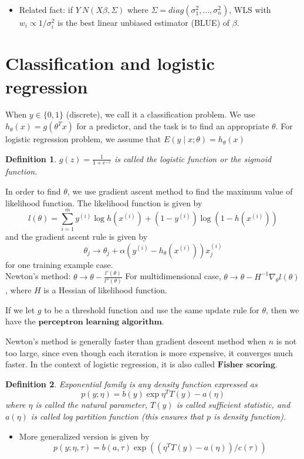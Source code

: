 \documentclass{article}
\newtheorem{definition}{Definition}
\theoremstyle{remark}
\begin{document}
\begin{itemize}
    \item Related fact: if $Y~N(X\beta, \Sigma)$ where $\Sigma=diag(\sigma_1^2,\dots,\sigma^2_n)$, WLS with $w_i\propto 1/\sigma^2_i$ is the best linear unbiased estimator (BLUE) of $\beta$.
\end{itemize}

\section*{Classification and logistic regression}
When $y\in\{0,1\}$ (discrete), we call it a classification problem. We use $h_\theta (x)=g(\theta^T x)$ for a predictor, and the task is to find an appropriate $\theta$. For logistic regression problem, we assume that $E(y\mid x;\theta)=h_\theta (x)$
\begin{definition}
$g(z)=\frac 1{1+e^{-z}}$ is called the logistic function or the sigmoid function.
\end{definition}
In order to find $\theta$, we use gradient ascent method to find the maximum value of likelihood function. The likelihood function is given by $$l(\theta)=\sum_{i=1}^m y^{(i)}\log h(x^{(i)})+(1-y^{(i)})\log(1-h(x^{(i)}))$$ and the gradient ascent rule is given by $$\theta_j\to\theta_j + \alpha(y^{(i)}-h_\theta (x^{(i)}))x^{(i)}_j$$ for one training example case.\\

 Newton's method: $\theta \to \theta-\frac{l'(\theta)}{l''(\theta)}$
For multidimensional case, $\theta\to \theta-H^{-1}\nabla_\theta l(\theta)$, where $H$ is a Hessian of likelihood function.

If we let $g$ to be a threshold function and use the same update rule for $\theta$, then we have the $\textbf{perceptron learning algorithm}$.

Newton's method is generally faster than gradient descent method when $n$ is not too large, since even though each iteration is more expensive, it converges much faster. In the context of logistic regression, it is also called $\textbf{Fisher scoring}$.
\begin{definition}
Exponential family is any density function expressed as $$p(y;\eta)=b(y)\exp{\eta^T T(y)-a(\eta)}$$ where $\eta$ is called the natural parameter, $T(y)$ is called sufficient statistic, and $a(\eta)$ is called log partition function (this ensures that $p$ is density function).
\end{definition}

\begin{itemize}
    \item More generalized version is given by $$p(y;\eta,\tau)=b(a,\tau)\exp{((\eta^T T(y)-a(\eta))/c(\tau))}$$
\end{itemize}
\end{document}
